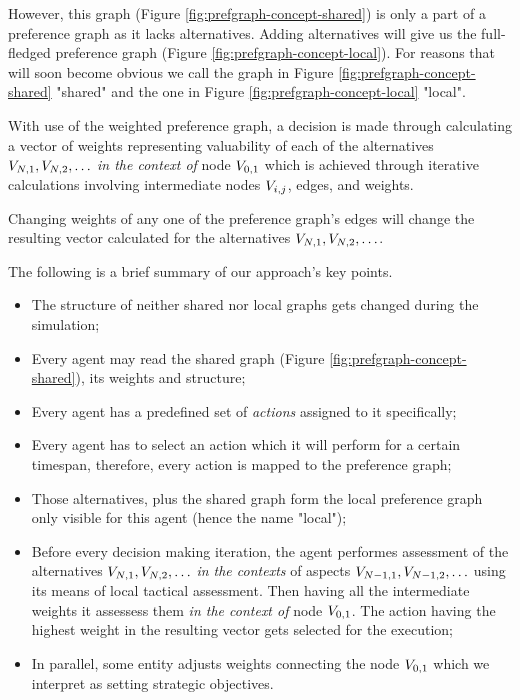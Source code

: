 However, this graph (Figure \ref{fig:prefgraph-concept-shared}) is only a part of a preference graph as it lacks
alternatives. Adding alternatives will give us the full-fledged preference graph (Figure
\ref{fig:prefgraph-concept-local}). For reasons that will soon become obvious we call the graph in Figure
\ref{fig:prefgraph-concept-shared} "shared" and the one in Figure \ref{fig:prefgraph-concept-local} "local".

With use of the weighted preference graph, a decision is made through calculating a vector of weights representing
valuability of each of the alternatives $V_{N,1}, V_{N,2},\ldots$ \textit{in the context of} node $V_{0,1}$ which is
achieved through iterative calculations involving intermediate nodes $V_{i,j}$, edges, and weights.

Changing weights of any one of the preference graph's edges will change the resulting vector calculated for the alternatives
$V_{N,1}, V_{N,2},\ldots$.

The following is a brief summary of our approach's key points.

\begin{itemize}
    \item The structure of neither shared nor local graphs gets changed during the simulation;
    \item Every agent may read the shared graph (Figure \ref{fig:prefgraph-concept-shared}), its weights and structure;
    \item Every agent has a predefined set of \textit{actions} assigned to it specifically;
    \item Every agent has to select an action which it will perform for a certain timespan, therefore, every action is
        mapped to the preference graph;
    \item Those alternatives, plus the shared graph form the local preference graph only visible for this agent (hence
        the name "local");
    \item Before every decision making iteration, the agent performes assessment of the alternatives $V_{N,1}, V_{N,2},\ldots$ \textit{in the contexts} of
        aspects $ V_{N-1,1}, V_{N-1,2}, \ldots $ using its means of local tactical assessment. Then having all the intermediate weights
        it assessess them \textit{in the context of} node $V_{0,1}$. The action having the highest weight in the
        resulting vector gets selected for the execution;
    \item In parallel, some entity adjusts weights connecting the node $V_{0,1}$ which we interpret as setting
        strategic objectives.
\end{itemize}

